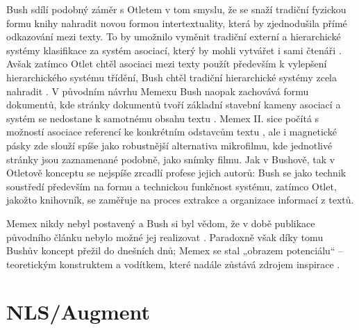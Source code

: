 
\label{p:memex:form}
Bush sdílí podobný záměr s Otletem v tom smyslu, že se snaží tradiční fyzickou formu knihy nahradit novou formou intertextuality, která by zjednodušila přímé odkazování mezi texty. To by umožnilo vyměnit tradiční externí a hierarchické systémy klasifikace za systém asociací, který by mohli vytvářet i sami čtenáři \autocite[199]{Wright2007}. Avšak zatímco Otlet chtěl asociaci mezi texty použít především k vylepšení hierarchického systému třídění, Bush chtěl tradiční hierarchické systémy zcela nahradit \autocite[199--200]{Wright2007}. V původním návrhu Memexu Bush naopak zachovává formu dokumentů, kde stránky dokumentů tvoří základní stavební kameny asociací a systém se nedostane k samotnému obsahu textu \autocite[200]{Wright2007}. Memex II. sice počítá s možností asociace referencí ke konkrétním odstavcům textu \autocite[175]{Bush:Memex2}, ale i magnetické pásky zde slouží spíše jako robustnější alternativa mikrofilmu, kde jednotlivé stránky jsou zaznamenané podobně, jako snímky filmu. Jak v Bushově, tak v Otletově konceptu se nejspíše zrcadlí profese jejich autorů: Bush se jako technik soustředí především na formu a technickou funkčnost systému, zatímco Otlet, jakožto knihovník, se zaměřuje na proces extrakce a organizace informací z textů.

Memex nikdy nebyl postavený a Bush si byl vědom, že v době publikace původního článku nebylo možné jej realizovat \autocite[69]{Barnet2008}. Paradoxně však díky tomu Bushův koncept přežil do dnešních dnů; Memex se stal „obrazem potenciálu“ – teoretickým konstruktem a vodítkem, které nadále zůstává zdrojem inspirace \autocite[200]{Wright2007}.



\section{NLS/Augment}
\label{sec:nls}

